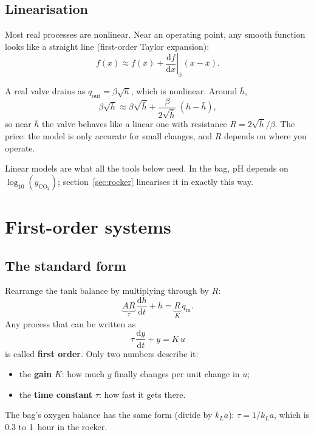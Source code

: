 \documentclass[11pt,a4paper]{article}
\newcommand{\dd}{\mathrm{d}}
\begin{document}
\subsection{Linearisation}
Most real processes are nonlinear. Near an operating point, any smooth function looks like a straight
line (first-order Taylor expansion):
\begin{equation}
  f(x) \approx f(\bar x) + \left.\frac{\dd f}{\dd x}\right|_{\bar x} (x - \bar x).
\end{equation}

\begin{example}[title={Example: a real valve}]
A real valve drains as $q_{\mathrm{out}} = \beta\sqrt{h}$, which is nonlinear. Around $\bar h$,
\[
  \beta\sqrt{h} \approx \beta\sqrt{\bar h} + \frac{\beta}{2\sqrt{\bar h}}\,(h - \bar h),
\]
so near $\bar h$ the valve behaves like a linear one with resistance $R = 2\sqrt{\bar h}/\beta$. The price:
the model is only accurate for small changes, and $R$ depends on where you operate.
\end{example}

Linear models are what all the tools below need. In the bag, pH depends on $\log_{10}(y_{\mathrm{CO_2}})$;
section~\ref{sec:rocker} linearises it in exactly this way.

\section{First-order systems}
\label{sec:first}

\subsection{The standard form}
Rearrange the tank balance by multiplying through by $R$:
\[
  \underbrace{AR}_{\tau}\,\frac{\dd h}{\dd t} + h = \underbrace{R}_{K}\,q_{\mathrm{in}} .
\]
Any process that can be written as
\begin{equation}
  \tau\,\frac{\dd y}{\dd t} + y = K\,u
  \label{eq:first}
\end{equation}
is called \textbf{first order}. Only two numbers describe it:
\begin{itemize}
  \item the \textbf{gain} $K$: how much $y$ finally changes per unit change in $u$;
  \item the \textbf{time constant} $\tau$: how fast it gets there.
\end{itemize}
The bag's oxygen balance has the same form (divide by $k_La$): $\tau = 1/k_La$, which is 0.3 to 1~hour in
the rocker.
\end{document}
